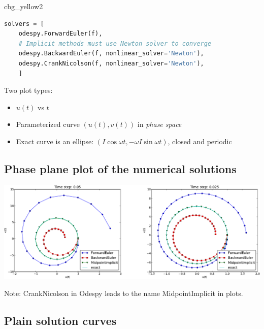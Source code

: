 \documentclass[%
oneside,                 %
final,                   %
10pt]{article}
\newenvironment{_cod_tight}[1]{
   \def\FrameCommand{\colorbox{#1}}
   \FrameRule0.6pt\MakeFramed {\FrameRestore}\vskip3mm}
   {\vskip0mm\endMakeFramed}
\newenvironment{cod}[1]{
\bgroup\rmfamily
\fboxsep=0mm\relax
\begin{_cod_tight}{#1}
\list{}{\parsep=-2mm\parskip=0mm\topsep=0pt\leftmargin=2mm
\rightmargin=2\leftmargin\leftmargin=4pt\relax}
\item\relax}
{\endlist\end{_cod_tight}\egroup}
\begin{document}
\begin{cod}{cbg_yellow2}\begin{lstlisting}[language=Python,style=simple,xleftmargin=2mm]
solvers = [
    odespy.ForwardEuler(f),
    # Implicit methods must use Newton solver to converge
    odespy.BackwardEuler(f, nonlinear_solver='Newton'),
    odespy.CrankNicolson(f, nonlinear_solver='Newton'),
    ]
\end{lstlisting}\end{cod}
\noindent

Two plot types:

\begin{itemize}
  \item $u(t)$ vs $t$

  \item Parameterized curve $(u(t), v(t))$ in \emph{phase space}

  \item Exact curve is an ellipse: $(I\cos\omega t, -\omega I\sin\omega t)$,
    closed and periodic
\end{itemize}

\noindent
\subsection*{Phase plane plot of the numerical solutions}



\centerline{\includegraphics[width=1.0\linewidth]{fig-vib/vib_theta_1_pp.pdf}}



Note: CrankNicolson in Odespy leads to the name MidpointImplicit in plots.

\subsection*{Plain solution curves}
\end{document}
